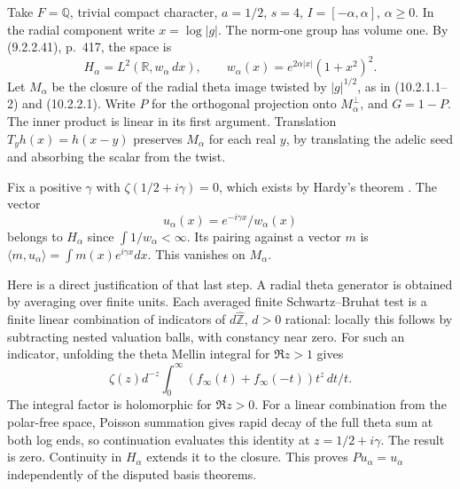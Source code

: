 \documentclass[11pt,reqno]{amsart}
\numberwithin{equation}{section}
\newcommand{\Q}{\mathbb Q}\newcommand{\R}{\mathbb R}\newcommand{\C}{\mathbb C}\newcommand{\Z}{\mathbb Z}
\begin{document}
Take \(F=\Q\), trivial compact character, \(a=1/2\), \(s=4\), \(I=[-\alpha,\alpha]\), \(\alpha\ge0\). In the radial component write \(x=\log|g|\). The norm-one group has volume one. By (9.2.2.41), p.~417, the space is
\[
 H_\alpha=L^2(\R,w_\alpha\,dx),\qquad w_\alpha(x)=e^{2\alpha|x|}(1+x^2)^2.
\]
Let \(M_\alpha\) be the closure of the radial theta image twisted by \(|g|^{1/2}\), as in (10.2.1.1--2) and (10.2.2.1). Write \(P\) for the orthogonal projection onto \(M_\alpha^\perp\), and \(G=1-P\). The inner product is linear in its first argument. Translation \(T_y h(x)=h(x-y)\) preserves \(M_\alpha\) for each real \(y\), by translating the adelic seed and absorbing the scalar from the twist.
 
Fix a positive \(\gamma\) with \(\zeta(1/2+i\gamma)=0\), which exists by Hardy's theorem \cite{hardy}. The vector
\[
                 u_\alpha(x)=e^{-i\gamma x}/w_\alpha(x)
\]
belongs to \(H_\alpha\) since \(\int 1/w_\alpha<\infty\). Its pairing against a vector \(m\) is \(\langle m,u_\alpha\rangle=\int m(x)e^{i\gamma x}dx\). This vanishes on \(M_\alpha\).

Here is a direct justification of that last step. A radial theta generator is obtained by averaging over finite units. Each averaged finite Schwartz--Bruhat test is a finite linear combination of indicators of \(d\widehat{\Z}\), \(d>0\) rational: locally this follows by subtracting nested valuation balls, with constancy near zero. For such an indicator, unfolding the theta Mellin integral for \(\Re z>1\) gives
\[
       \zeta(z)d^{-z}\int_0^\infty(f_\infty(t)+f_\infty(-t))t^z\,dt/t .
\]
The integral factor is holomorphic for \(\Re z>0\). For a linear combination from the polar-free space, Poisson summation gives rapid decay of the full theta sum at both log ends, so continuation evaluates this identity at \(z=1/2+i\gamma\). The result is zero. Continuity in \(H_\alpha\) extends it to the closure. This proves \(Pu_\alpha=u_\alpha\) independently of the disputed basis theorems.
\end{document}
